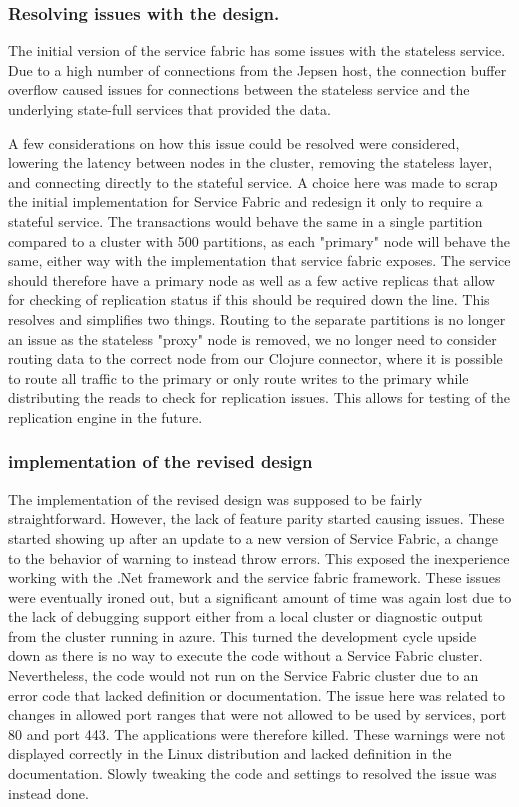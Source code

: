 \documentclass[a4paper,10pt,titlepage]{report}
\begin{document}
\subsubsection{Resolving issues with the design.}
   

The initial version of the service fabric has some issues with the stateless service. Due to a high number of connections from the Jepsen host, the connection buffer overflow caused issues for connections between the stateless service and the underlying state-full services that provided the data.

A few considerations on how this issue could be resolved were considered, lowering the latency between nodes in the cluster, removing the stateless layer, and connecting directly to the stateful service. A choice here was made to scrap the initial implementation for Service Fabric and redesign it only to require a stateful service. The transactions would behave the same in a  single partition compared to a cluster with 500 partitions, as each "primary" node will behave the same, either way with the implementation that service fabric exposes. The service should therefore have a primary node as well as a few active replicas that allow for checking of replication status if this should be required down the line. This resolves and simplifies two things. Routing to the separate partitions is no longer an issue as the stateless "proxy" node is removed, we no longer need to consider routing data to the correct node from our Clojure connector, where it is possible to route all traffic to the primary or only route writes to the primary while distributing the reads to check for replication issues. This allows for testing of the replication engine in the future.

\subsubsection{implementation of the revised design}

The implementation of the revised design was supposed to be fairly straightforward. However, the lack of feature parity started causing issues. These started showing up after an update to a new version of Service Fabric, a change to the behavior of warning to instead throw errors. This exposed the inexperience working with the .Net framework and the service fabric framework. These issues were eventually ironed out, but a significant amount of time was again lost due to the lack of debugging support either from a local cluster or diagnostic output from the cluster running in azure. This turned the development cycle upside down as there is no way to execute the code without a Service Fabric cluster.
\\ \vspace{5mm}
Nevertheless, the code would not run on the Service Fabric cluster due to an error code that lacked definition or documentation. The issue here was related to changes in allowed port ranges that were not allowed to be used by services, port 80 and port 443. The applications were therefore killed. These warnings were not displayed correctly in the Linux distribution and lacked definition in the documentation. Slowly tweaking the code and settings to resolved the issue was instead done.
\end{document}
